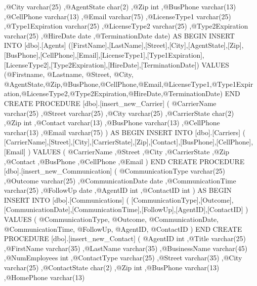            ,@City varchar(25)			
           ,@AgentState char(2)			
           ,@Zip int			
           ,@BusPhone varchar(13)			
           ,@CellPhone varchar(13)			
           ,@Email varchar(75)			
           ,@LicenseType1 varchar(25)			
           ,@Type1Expiration varchar(25)			
           ,@LicenseType2 varchar(25)			
           ,@Type2Expiration varchar(25)			
           ,@HireDate date			
           ,@TerminationDate date)			AS			BEGIN			
INSERT INTO [dbo].[Agents]			
			([FirstName],[LastName],[Street],[City],[AgentState],[Zip],[BusPhone],[CellPhone],[Email],[LicenseType1],[Type1Expiration], [LicenseType2],[Type2Expiration],[HireDate],[TerminationDate])
VALUES			
			(@Firstname, @Lastname, @Street, @City, @AgentState,@Zip,@BusPhone,@CellPhone,@Email,@LicenseType1,@Type1Expiration,@LicenseType2,@Type2Expiration,@HireDate,@TerminationDate)		
END
CREATE PROCEDURE [dbo].[insert_new_Carrier]			
(			
    @CarrierName varchar(25)			
           ,@Street varchar(25)			
           ,@City varchar(25)			
           ,@CarrierState char(2)			
           ,@Zip int			
           ,@Contact varchar(13)			
           ,@BusPhone varchar(13)			
           ,@CellPhone varchar(13)			
           ,@Email varchar(75)			
		   )		AS			BEGIN				
INSERT INTO [dbo].[Carriers]			
(			
[CarrierName],[Street],[City],[CarrierState],[Zip],[Contact],[BusPhone],[CellPhone],[Email]			
)			
     VALUES			
(			
@CarrierName ,@Street ,@City ,@CarrierState ,@Zip ,@Contact ,@BusPhone ,@CellPhone ,@Email 			
)			
END			
CREATE PROCEDURE [dbo].[insert_new_Communication]			
		(	
		    @CommunicationType varchar(25)	
           ,@Outcome varchar(25)			
           ,@CommunicationDate date			
           ,@CommunicationTime varchar(25)			
           ,@FollowUp date			
           ,@AgentID int			
           ,@ContactID int			
		)	AS			BEGIN				 	
	INSERT INTO [dbo].[Communications]			
(			
[CommunicationType],[Outcome],[CommunicationDate],[CommunicationTime],[FollowUp],[AgentID],[ContactID]			
)			
     VALUES			
(			
@CommunicationType, @Outcome, @CommunicationDate, @CommunicationTime, @FollowUp, @AgentID, @ContactID 			
)						
END			
CREATE PROCEDURE [dbo].[insert_new_Contact]			
			(
			@AgentID int
		   ,@Title varchar(25)
           ,@FirstName varchar(35)			
           ,@LastName varchar(35)			
           ,@BusinessName varchar(45)			
           ,@NumEmployees int			
           ,@ContactType varchar(25)			
           ,@Street varchar(35)			
           ,@City varchar(25)			
           ,@ContactState char(2)			
           ,@Zip int			
           ,@BusPhone varchar(13)			
           ,@HomePhone varchar(13)			
